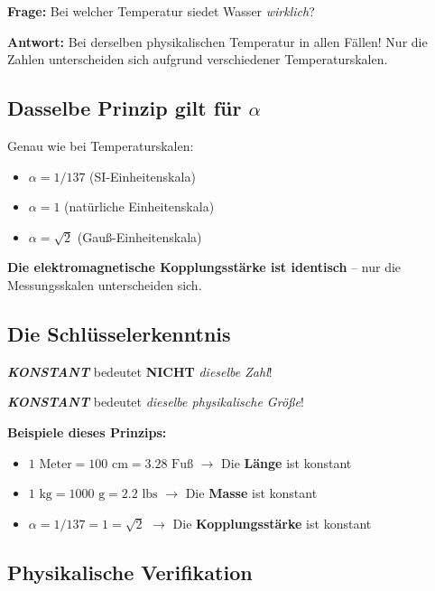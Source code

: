 	\textbf{Frage:} Bei welcher Temperatur siedet Wasser \textit{wirklich}?
	
	\textbf{Antwort:} Bei derselben physikalischen Temperatur in allen Fällen! Nur die Zahlen unterscheiden sich aufgrund verschiedener Temperaturskalen.
	
	\subsection{Dasselbe Prinzip gilt für $\alpha$}
	
	Genau wie bei Temperaturskalen:
	\begin{itemize}
		\item $\alpha = 1/137$ (SI-Einheitenskala)
		\item $\alpha = 1$ (natürliche Einheitenskala)
		\item $\alpha = \sqrt{2}$ (Gauß-Einheitenskala)
	\end{itemize}
	
	\textbf{Die elektromagnetische Kopplungsstärke ist identisch} -- nur die Messungsskalen unterscheiden sich.
	
	\subsection{Die Schlüsselerkenntnis}
	
	\begin{tcolorbox}[colback=yellow!5!white,colframe=orange!75!black,title=Fundamentales Prinzip]
		\textit{\textbf{KONSTANT}} bedeutet \textbf{NICHT} \textit{dieselbe Zahl}!
		
		\textit{\textbf{KONSTANT}} bedeutet \textit{dieselbe physikalische Größe}!
	\end{tcolorbox}
	
	\textbf{Beispiele dieses Prinzips:}
	\begin{itemize}
		\item $1\text{ Meter} = 100\text{ cm} = 3.28\text{ Fuß}$ $\rightarrow$ Die \textbf{Länge} ist konstant
		\item $1\text{ kg} = 1000\text{ g} = 2.2\text{ lbs}$ $\rightarrow$ Die \textbf{Masse} ist konstant
		\item $\alpha = 1/137 = 1 = \sqrt{2}$ $\rightarrow$ Die \textbf{Kopplungsstärke} ist konstant
	\end{itemize}
	
	\subsection{Physikalische Verifikation}
	
